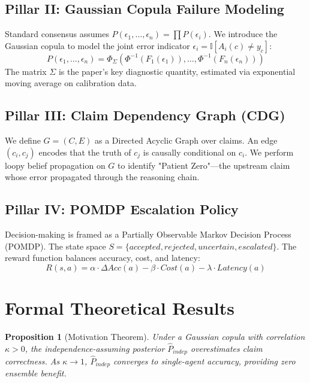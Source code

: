 \documentclass[conference]{IEEEtran}
\newtheorem{proposition}{Proposition}
\begin{document}
\subsection{Pillar II: Gaussian Copula Failure Modeling}
Standard consensus assumes $P(\epsilon_1, \dots, \epsilon_n) = \prod P(\epsilon_i)$. We introduce the Gaussian copula to model the joint error indicator $\epsilon_i = \mathbb{I}[A_i(c) \neq y_c]$:
\begin{equation} \label{eq:copula}
P(\epsilon_1, \dots, \epsilon_n) = \Phi_\Sigma(\Phi^{-1}(F_1(\epsilon_1)), \dots, \Phi^{-1}(F_n(\epsilon_n)))
\end{equation}
The matrix $\Sigma$ is the paper's key diagnostic quantity, estimated via exponential moving average on calibration data.

\subsection{Pillar III: Claim Dependency Graph (CDG)}
We define $G=(C, E)$ as a Directed Acyclic Graph over claims. An edge $(c_i, c_j)$ encodes that the truth of $c_j$ is causally conditional on $c_i$. We perform loopy belief propagation on $G$ to identify "Patient Zero"—the upstream claim whose error propagated through the reasoning chain.

\subsection{Pillar IV: POMDP Escalation Policy}
Decision-making is framed as a Partially Observable Markov Decision Process (POMDP). The state space $S = \{accepted, rejected, uncertain, escalated\}$. The reward function balances accuracy, cost, and latency:
\begin{equation}
R(s, a) = \alpha \cdot \Delta Acc(a) - \beta \cdot Cost(a) - \lambda \cdot Latency(a)
\end{equation}

\section{Formal Theoretical Results}

\begin{proposition}[Motivation Theorem]
Under a Gaussian copula with correlation $\kappa > 0$, the independence-assuming posterior $\hat{P}_{indep}$ overestimates claim correctness. As $\kappa \to 1$, $\hat{P}_{indep}$ converges to single-agent accuracy, providing zero ensemble benefit.
\end{proposition}
\end{document}
